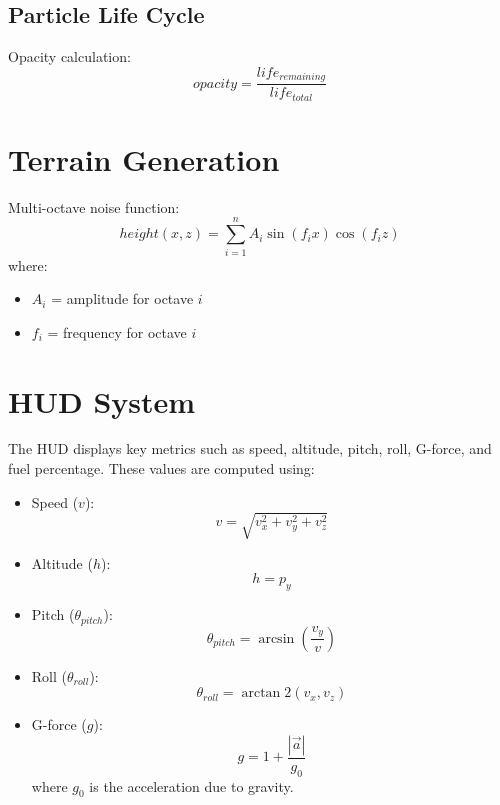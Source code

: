 \documentclass{article}
\begin{document}
\subsection{Particle Life Cycle}
Opacity calculation:
\begin{equation}
opacity = \frac{life_{remaining}}{life_{total}}
\end{equation}

\section{Terrain Generation}
Multi-octave noise function:
\begin{equation}
height(x,z) = \sum_{i=1}^n A_i\sin(f_ix)\cos(f_iz)
\end{equation}
where:
\begin{itemize}
\item $A_i$ = amplitude for octave $i$
\item $f_i$ = frequency for octave $i$
\end{itemize}

\section{HUD System}
The HUD displays key metrics such as speed, altitude, pitch, roll, G-force, and fuel percentage. These values are computed using:
\begin{itemize}
\item Speed ($v$):
\begin{equation}
v = \sqrt{v_x^2 + v_y^2 + v_z^2}
\end{equation}
\item Altitude ($h$):
\begin{equation}
h = p_y
\end{equation}
\item Pitch ($\theta_{pitch}$):
\begin{equation}
\theta_{pitch} = \arcsin\left(\frac{v_y}{v}\right)
\end{equation}
\item Roll ($\theta_{roll}$):
\begin{equation}
\theta_{roll} = \arctan2(v_x, v_z)
\end{equation}
\item G-force ($g$):
\begin{equation}
g = 1 + \frac{|\vec{a}|}{g_0}
\end{equation}
where $g_0$ is the acceleration due to gravity.
\end{itemize}
\end{document}
